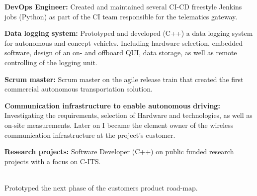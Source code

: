 \textbf{DevOps Engineer:} Created and maintained several CI-CD freestyle Jenkins jobs (Python) as part of the CI team responsible for the telematics gateway.
\SmallSep

\textbf{Data logging system:} Prototyped and developed (C++) a data logging system for autonomous and concept vehicles. Including hardware selection, embedded software, design of an on- and offboard QUI, data storage, as well as remote controlling of the logging unit. 
\SmallSep

\textbf{Scrum master:} Scrum master on the agile release train that created the first commercial autonomous transportation solution.
\SmallSep

\textbf{Communication infrastructure to enable autonomous driving:} Investigating the requirements, selection of Hardware and technologies, as well as on-site measurements. Later on I became the element owner of the wireless communication infrastructure at the project's customer.  
\SmallSep

\textbf{Research projects:} Software Developer (C++) on public funded research projects with a focus on C-ITS. \\
\Sep

 \\
Prototyped the next phase of the customers product road-map.